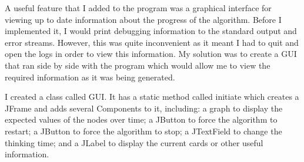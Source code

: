 







A useful feature that I added to the program was a graphical interface for viewing up to date information about the progress of the algorithm. Before I implemented it, I would print debugging information to the standard output and error streams. However, this was quite inconvenient as it meant I had to quit \pa and open the logs in order to view this information. My solution was to create a GUI that ran side by side with the \pa program which would allow me to view the required information as it was being generated. 

I created a class called GUI. It has a static method called initiate which creates a JFrame and adds several Components to it, including: a graph to display the expected values of the nodes over time; a JButton to force the algorithm to restart; a JButton to force the algorithm to stop; a JTextField to change the thinking time; and a JLabel to display the current cards or other useful information.

